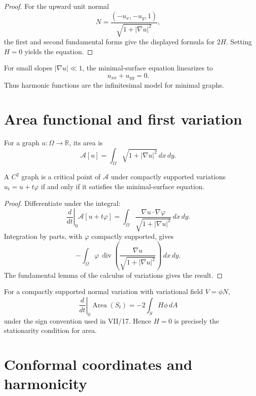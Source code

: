 \begin{proof}
For the upward unit normal
\[
N=\frac{(-u_x,-u_y,1)}{\sqrt{1+|\nabla u|^2}},
\]
the first and second fundamental forms give the displayed formula for \(2H\).
Setting \(H=0\) yields the equation.
\end{proof}

\begin{remark}[Linearization]\label{rem:vii19-linearization}
For small slopes \(|\nabla u|\ll1\), the minimal-surface equation linearizes to
\[
u_{xx}+u_{yy}=0.
\]
Thus harmonic functions are the infinitesimal model for minimal graphs.
\end{remark}

\section{Area functional and first variation}

For a graph \(u:\Omega\to\mathbb R\), its area is
\[
\mathcal A[u]
=
\int_\Omega \sqrt{1+|\nabla u|^2}\,dx\,dy.
\]

\begin{theorem}\label{thm:vii19-euler-lagrange}
A \(C^2\) graph is a critical point of \(\mathcal A\) under compactly supported
variations \(u_t=u+t\varphi\) if and only if it satisfies the minimal-surface
equation.
\end{theorem}

\begin{proof}
Differentiate under the integral:
\[
\left.\frac{d}{dt}\right|_{0}\mathcal A[u+t\varphi]
=
\int_\Omega
\frac{\nabla u\cdot\nabla\varphi}
{\sqrt{1+|\nabla u|^2}}\,dx\,dy.
\]
Integration by parts, with \(\varphi\) compactly supported, gives
\[
-\int_\Omega
\varphi\,
\operatorname{div}\!\left(
\frac{\nabla u}{\sqrt{1+|\nabla u|^2}}
\right)\,dx\,dy.
\]
The fundamental lemma of the calculus of variations gives the result.
\end{proof}

\begin{theorem}\label{thm:vii19-first-variation}
For a compactly supported normal variation with variational field
\(V=\phi N\),
\[
\left.\frac{d}{dt}\right|_{0}\operatorname{Area}(S_t)
=
-2\int_S H\phi\,dA
\]
under the sign convention used in VII/17.
Hence \(H=0\) is precisely the stationarity condition for area.
\end{theorem}

\section{Conformal coordinates and harmonicity}

